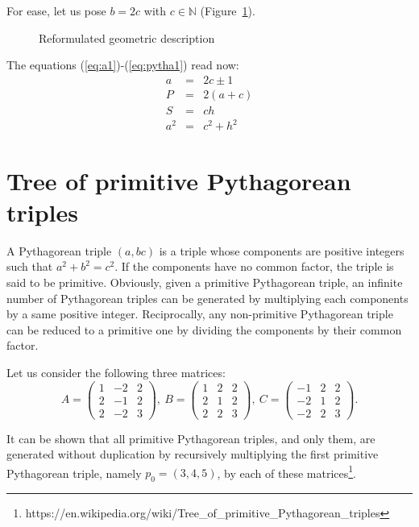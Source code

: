 \documentclass[11pt, a4paper]{article}
\newcommand{\Figure}[1]{Figure~\ref{#1}}
\newcommand{\set}[1]{\mathbb{#1}}
\begin{document}
For ease, let us pose $b=2c$ with $c\in\set N$ (\Figure{fig:triangle2}). 
\begin{figure}
    \begin{center}
        \caption{Reformulated geometric description}
        \label{fig:triangle2}
    \end{center}
\end{figure}

The equations (\ref{eq:a1})-(\ref{eq:pytha1}) read now:
\begin{eqnarray}
a & = & 2c \pm 1 \\
P & = & 2(a+c) \\ 
S & = & ch \\
a^2 & = & c^2 + h^2 
\end{eqnarray}

\section{Tree of primitive Pythagorean triples}
A Pythagorean triple $(a, b c)$ is a triple whose components are positive integers such that $a^2+b^2=c^2$. If the components have no common factor, the triple is said to be primitive. Obviously, given a primitive Pythagorean triple, an infinite number of Pythagorean triples can be generated by multiplying each components by a same positive integer. Reciprocally, any non-primitive Pythagorean triple can be reduced to a primitive one by dividing the components by their common factor.

Let us consider the following three matrices:
\[
A = \left(\begin{matrix}  1 & -2 & 2 \\  2 & -1 & 2 \\  2 & -2 & 3 \end{matrix} \right)\!,\ 
B = \left(\begin{matrix}  1 &  2 & 2 \\  2 &  1 & 2 \\  2 &  2 & 3 \end{matrix} \right)\!,\
C = \left(\begin{matrix} -1 &  2 & 2 \\ -2 &  1 & 2 \\ -2 &  2 & 3 \end{matrix} \right)\!.
\]

It can be shown that all primitive Pythagorean triples, and only them, are generated without duplication by recursively multiplying the first primitive Pythagorean triple, namely $p_0=(3, 4, 5)$, by each of these matrices\footnote{https://en.wikipedia.org/wiki/Tree\_of\_primitive\_Pythagorean\_triples}.
\end{document}
